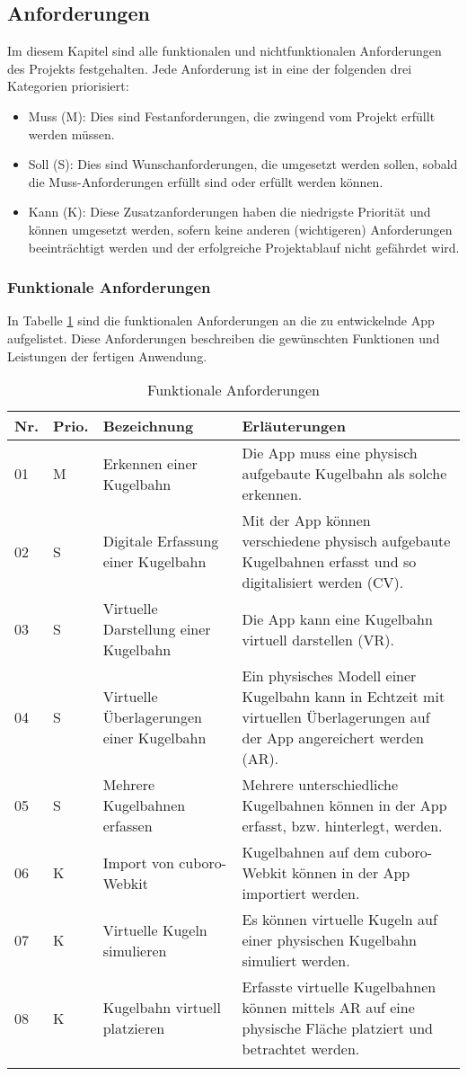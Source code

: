 \subsection{Anforderungen}
Im diesem Kapitel sind alle funktionalen und nichtfunktionalen Anforderungen des Projekts festgehalten. Jede Anforderung ist in eine der folgenden drei Kategorien priorisiert:
\begin{itemize}
	\item Muss (M): Dies sind Festanforderungen, die zwingend vom Projekt erfüllt werden müssen.
	\item Soll (S): Dies sind Wunschanforderungen, die umgesetzt werden sollen, sobald die Muss-Anforderungen erfüllt sind oder erfüllt werden können.
	\item Kann (K): Diese Zusatzanforderungen haben die niedrigste Priorität und können umgesetzt werden, sofern keine anderen (wichtigeren) Anforderungen beeinträchtigt werden und der erfolgreiche Projektablauf nicht gefährdet wird.
\end{itemize}

\subsubsection{Funktionale Anforderungen}
In Tabelle \ref{tab:funktionale-anforderungen} sind die funktionalen Anforderungen an die zu entwickelnde App aufgelistet. Diese Anforderungen beschreiben die gewünschten Funktionen und Leistungen der fertigen Anwendung.

\begin{longtable}{l l p{4.7cm} p{8cm}}
	\hline
	\textbf{Nr.} & \textbf{Prio.} & \textbf{Bezeichnung} & \textbf{Erläuterungen} \\
	\hline
	01 & M & Erkennen einer Kugelbahn & Die App muss eine physisch aufgebaute Kugelbahn als solche erkennen. \\
	02 & S & Digitale Erfassung einer Kugelbahn & Mit der App können verschiedene physisch aufgebaute Kugelbahnen erfasst und so digitalisiert werden (CV). \\
	03 & S & Virtuelle Darstellung einer Kugelbahn & Die App kann eine Kugelbahn virtuell darstellen (VR). \\
	04 & S & Virtuelle Überlagerungen einer Kugelbahn & Ein physisches Modell einer Kugelbahn kann in Echtzeit mit virtuellen Überlagerungen auf der App angereichert werden (AR). \\
	05 & S & Mehrere Kugelbahnen erfassen & Mehrere unterschiedliche Kugelbahnen können in der App erfasst, bzw. hinterlegt, werden. \\
	06 & K & Import von cuboro-Webkit & Kugelbahnen auf dem cuboro-Webkit können in der App importiert werden. \\
	07 & K & Virtuelle Kugeln simulieren & Es können virtuelle Kugeln auf einer physischen Kugelbahn simuliert werden. \\
	08 & K & Kugelbahn virtuell platzieren & Erfasste virtuelle Kugelbahnen können mittels AR auf eine physische Fläche platziert und betrachtet werden. \\
	\hline
	\caption{Funktionale Anforderungen}
	\label{tab:funktionale-anforderungen}
\end{longtable}

